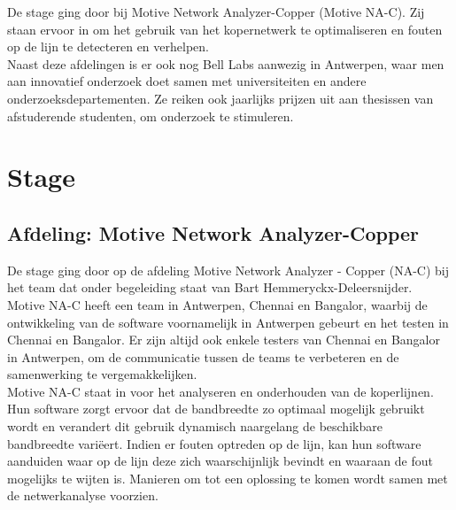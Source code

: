 \documentclass[10pt,a4paper]{article}
\begin{document}
De stage ging door bij Motive Network Analyzer-Copper (Motive NA-C). Zij staan ervoor in om het gebruik van het kopernetwerk te optimaliseren en fouten op de lijn te detecteren en verhelpen.\\
Naast deze afdelingen is er ook nog Bell Labs aanwezig in Antwerpen, waar men aan innovatief onderzoek doet samen met universiteiten en andere onderzoeksdepartementen. Ze reiken ook jaarlijks prijzen uit aan thesissen van afstuderende studenten, om onderzoek te stimuleren. 

\section{Stage}
\label{stage}
\subsection{Afdeling: Motive Network Analyzer-Copper}
\label{afdeling}
De stage ging door op de afdeling Motive Network Analyzer - Copper (NA-C) bij het team dat onder begeleiding staat van Bart Hemmeryckx-Deleersnijder. Motive NA-C heeft een team in Antwerpen, Chennai en Bangalor, waarbij de ontwikkeling van de software voornamelijk in Antwerpen gebeurt en het testen in Chennai en Bangalor. Er zijn altijd ook enkele testers van Chennai en Bangalor in Antwerpen, om de communicatie tussen de teams te verbeteren en de samenwerking te vergemakkelijken.\\
Motive NA-C staat in voor het analyseren en onderhouden van de koperlijnen. Hun software zorgt ervoor dat de bandbreedte zo optimaal mogelijk gebruikt wordt en verandert dit gebruik dynamisch naargelang de beschikbare bandbreedte vari\"eert. Indien er fouten optreden op de lijn, kan hun software aanduiden waar op de lijn deze zich waarschijnlijk bevindt en waaraan de fout mogelijks te wijten is. Manieren om tot een oplossing te komen wordt samen met de netwerkanalyse voorzien.
\end{document}
